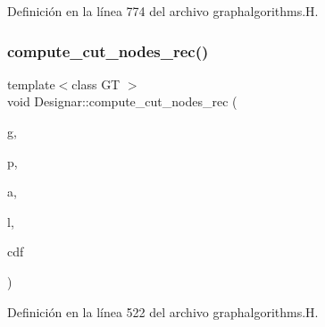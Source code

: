 Definición en la línea 774 del archivo graphalgorithms.\+H.

\mbox{\label{namespace_designar_ac547a8b8e0e7a9a8ead8899c02b42128}} 
\subsubsection{\texorpdfstring{compute\+\_\+cut\+\_\+nodes\+\_\+rec()}{compute\_cut\_nodes\_rec()}}
{\footnotesize\ttfamily template$<$class GT $>$ \\
void Designar\+::compute\+\_\+cut\+\_\+nodes\+\_\+rec (\begin{DoxyParamCaption}\item[{\hyperlink{demo-buildgraph_8_c_a3001c40d2c31ca87ed96cd7d1334a55e}{GT} \&}]{g,  }\item[{\hyperlink{namespace_designar_a5af326c65aa2bd26b26c410f2030d09e}{Node}$<$ \hyperlink{demo-buildgraph_8_c_a3001c40d2c31ca87ed96cd7d1334a55e}{GT} $>$ \&}]{p,  }\item[{\hyperlink{namespace_designar_a3f55fb5513d62ff47cbc8f72b8e95d6f}{Arc}$<$ \hyperlink{demo-buildgraph_8_c_a3001c40d2c31ca87ed96cd7d1334a55e}{GT} $>$ \&}]{a,  }\item[{\hyperlink{class_designar_1_1_s_l_list}{S\+L\+List}$<$ \hyperlink{namespace_designar_a5af326c65aa2bd26b26c410f2030d09e}{Node}$<$ \hyperlink{demo-buildgraph_8_c_a3001c40d2c31ca87ed96cd7d1334a55e}{GT} $>$ $\ast$$>$ \&}]{l,  }\item[{\hyperlink{namespace_designar_a9d113d66a39e82b73727c72cd3a52f73}{lint\+\_\+t} \&}]{cdf }\end{DoxyParamCaption})}



Definición en la línea 522 del archivo graphalgorithms.\+H.

\mbox{\label{namespace_designar_a8b65b45b1581bbf5b74899490a8b8c61}} 
